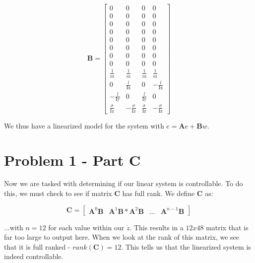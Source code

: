 \documentclass{article}
\begin{document}
\begin{equation}
    \boldsymbol{B} =
    \begin{bmatrix}
        0 & 0 & 0 & 0\\
        0 & 0 & 0 & 0\\
        0 & 0 & 0 & 0\\
        0 & 0 & 0 & 0\\
        0 & 0 & 0 & 0\\
        0 & 0 & 0 & 0\\
        0 & 0 & 0 & 0\\
        0 & 0 & 0 & 0\\
        \frac{1}{m} & \frac{1}{m} & \frac{1}{m} & \frac{1}{m}\\
        0 & \frac{l}{\mathrm{Ix}} & 0 & -\frac{l}{\mathrm{Ix}}\\
        -\frac{l}{\mathrm{Iy}} & 0 & \frac{l}{\mathrm{Iy}} & 0\\
        \frac{\sigma }{\mathrm{Iz}} & -\frac{\sigma }{\mathrm{Iz}} & \frac{\sigma }{\mathrm{Iz}} & -\frac{\sigma }{\mathrm{Iz}}
        \end{bmatrix}
\end{equation}

We thus have a linearized model for the system with $\dot{e} = \boldsymbol{A}e + \boldsymbol{B}w$.

\section*{Problem 1 - Part C}

Now we are tasked with determining if our linear system is controllable. To do this, we must check to see if matrix $\boldsymbol{C}$ has full rank. We define $\boldsymbol{C}$ as:

\begin{equation}
    \boldsymbol{C} = \begin{bmatrix}
        \boldsymbol{A}^0\boldsymbol{B} & \boldsymbol{A}^1\boldsymbol{B} * \boldsymbol{A}^2\boldsymbol{B} & \ldots & \boldsymbol{A}^{n-1}\boldsymbol{B}
    \end{bmatrix}
\end{equation}

...with $n=12$ for each value within our $\dot{z}$. This results in a $12x48$ matrix that is far too large to output here. When we look at the rank of this matrix, we see that it is full ranked - $rank(\boldsymbol{C}) = 12$. This tells us that the linearized system is indeed controllable.
\end{document}
